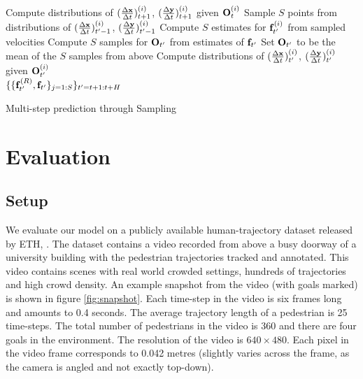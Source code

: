 \begin{algorithm}[h]
  \begin{algorithmic}[1]
     \State Compute distributions of
    $(\frac{\Delta \mathbf{x}}{\Delta t})_{t+1}^{(i)}$, $(\frac{\Delta \mathbf{y}}{\Delta t})_{t+1}^{(i)}$ given
    $\mathbf{O}^{(i)}_t$\label{alg:line:start}
    \EndFor
      \State Sample $S$
    points from distributions of $(\frac{\Delta \mathbf{x}}{\Delta t})_{t'-1}^{(i)}$,
    $(\frac{\Delta \mathbf{y}}{\Delta t})_{t'-1}^{(i)}$\label{alg:line:sample} \State Compute $S$
    estimates for $\mathbf{f}^{(i)}_{t'}$ from sampled
    velocities\label{alg:line:estimate}
    \EndFor
    \State Compute $S$ samples for $\mathbf{O}_{t'}$ from estimates of
    $\mathbf{f}_{t'}$\label{alg:line:estimateocc} \State Set $\mathbf{O}_{t'}$
    to be the mean of the $S$ samples from above \label{alg:line:mean}
     \State Compute distributions of
    $(\frac{\Delta \mathbf{x}}{\Delta t})_{t'}^{(i)}$, $(\frac{\Delta \mathbf{y}}{\Delta t})_{t'}^{(i)}$ given
    $\mathbf{O}^{(i)}_{t'}$\label{alg:line:repeat}
    \EndFor
    \EndFor \\
    \Return
    $\{\{\mathbf{f}^{(R)}_{t'},
    \mathbf{f}_{t'}\}_{j=1:S}\}_{t'=t+1:t+H}$\label{alg:line:return}
  \end{algorithmic}
  \caption{Multi-step prediction through Sampling}
  \label{alg:sampling}
\end{algorithm}



\section{Evaluation}
\label{sec:evaluation}

\subsection{Setup}
\label{sec:setup}

We evaluate our model on a publicly available human-trajectory dataset
released by ETH, \cite{pellegrini09}.
%
%
%
%
The dataset contains a video recorded from above a busy doorway of a
university building with the pedestrian trajectories tracked and
annotated.  This video contains scenes with real world crowded
settings, hundreds of trajectories and high crowd density.
%
%
%
%
%
An example snapshot from the video (with goals marked) is shown in
figure \ref{fig:snapshot}. Each time-step in the video is six frames
long and amounts to 0.4 seconds. The average trajectory length of a
pedestrian is 25 time-steps. The total number of pedestrians in the
video is 360 and there are four goals in the environment. The
resolution of the video is $640 \times 480$. Each pixel in the video
frame corresponds to 0.042 metres (slightly varies across the frame,
as the camera is angled and not exactly top-down).

